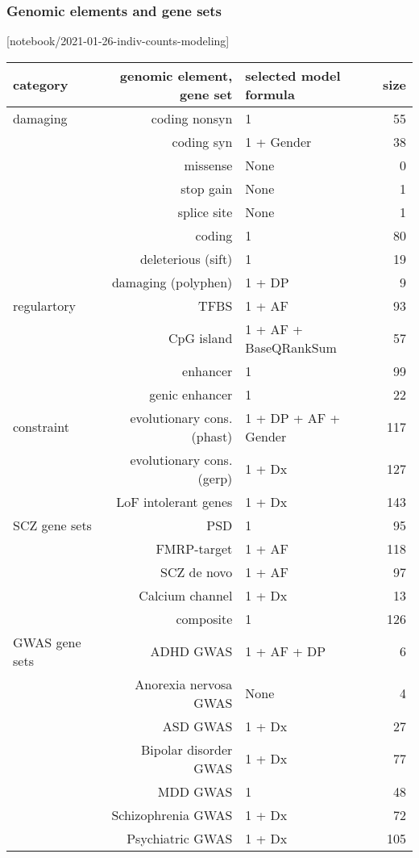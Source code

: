 \documentclass[letterpaper]{article}
\begin{document}
\subsubsection*{Genomic elements and gene sets}

[notebook/2021-01-26-indiv-counts-modeling]

\begin{tabular}{lrlr}
category & genomic element, gene set & selected model formula & size \\
\hline
\hline
damaging & coding nonsyn & 1 & 55 \\
& coding syn & 1 + Gender & 38 \\
& missense & None & 0 \\
& stop gain & None & 1 \\
& splice site & None & 1 \\
& coding & 1 & 80 \\
& deleterious (sift) & 1 & 19 \\
& damaging (polyphen) & 1 + DP & 9 \\
\hline
regulartory & TFBS & 1 + AF & 93 \\
& CpG island & 1 + AF + BaseQRankSum & 57 \\
& enhancer & 1 & 99 \\
& genic enhancer & 1 & 22 \\
\hline
constraint & evolutionary cons. (phast) & 1 + DP + AF + Gender & 117 \\
& evolutionary cons. (gerp) & 1 + Dx & 127 \\
& LoF intolerant genes & 1 + Dx & 143 \\
\hline
SCZ gene sets & PSD & 1 & 95 \\
& FMRP-target & 1 + AF & 118 \\
& SCZ de novo & 1 + AF & 97 \\
& Calcium channel & 1 + Dx & 13 \\
& composite & 1 & 126 \\
\hline
GWAS gene sets & ADHD GWAS & 1 + AF + DP & 6 \\
& Anorexia nervosa GWAS & None & 4 \\
& ASD GWAS & 1 + Dx & 27 \\
& Bipolar disorder GWAS & 1 + Dx & 77 \\
& MDD GWAS & 1 & 48 \\
& Schizophrenia GWAS & 1 + Dx & 72 \\
& Psychiatric GWAS & 1 + Dx & 105 \\
\end{tabular}
\end{document}
